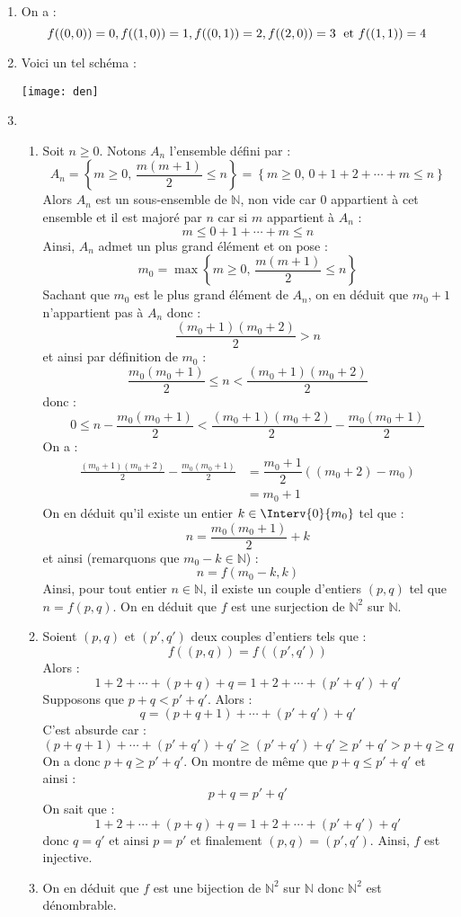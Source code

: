 \documentclass[a4paper,10pt]{report}
\begin{document}
\corr 
\begin{enumerate}
\item On a :
$$ f((0,0)) = 0,f((1,0))=1, f((0,1))= 2, f((2,0))=3 \; \hbox{ et } f((1,1))=4$$

\item Voici un tel schéma : 

\begin{center}
\texttt{[image: den]}
\end{center}

\item 
\begin{enumerate}
\item Soit $n \geq 0$. Notons $A_n$ l'ensemble défini par :
$$ A_n = \left\lbrace m \geq 0, \, \frac{m(m+1)}{2} \leq n \right\rbrace = \left\lbrace m \geq 0, \, 0+1+2+ \cdots + m \leq n \right\rbrace$$
Alors $A_n$ est un sous-ensemble de $\mathbb{N}$, non vide car $0$ appartient à cet ensemble et il est majoré par $n$ car si $m$ appartient à $A_n$ :
$$ m \leq 0+1+ \cdots + m \leq n$$
Ainsi, $A_n$ admet un plus grand élément et on pose :
$$ m_0 = \max \left\lbrace m \geq 0, \, \frac{m(m+1)}{2} \leq n \right\rbrace$$
Sachant que $m_0$ est le plus grand élément de $A_n$, on en déduit que $m_0+1$ n'appartient pas à $A_n$ donc :
$$ \frac{(m_0+1)(m_0+2)}{2} > n$$
et ainsi par définition de $m_0$ :
$$ \frac{m_0(m_0+1)}{2} \leq n  <\frac{(m_0+1)(m_0+2)}{2}$$
donc :
$$   0 \leq  n- \frac{m_0(m_0+1)}{2} <\frac{(m_0+1)(m_0+2)}{2} - \frac{m_0(m_0+1)}{2}$$
On a :
\begin{align*}
\frac{(m_0+1)(m_0+2)}{2} - \frac{m_0(m_0+1)}{2} & = \dfrac{m_0+1}{2} ((m_0+2)-m_0) \\
& = m_0+1 
\end{align*}
On en déduit qu'il existe un entier $k \in \Interv{0}{m_0}$ tel que :
$$ n = \frac{m_0(m_0+1)}{2} + k$$
et ainsi (remarquons que $m_0-k \in \mathbb{N}$) : 
$$ n = f(m_0-k,k)$$
Ainsi, pour tout entier $n \in \mathbb{N}$, il existe un couple d'entiers $(p,q)$ tel que $n=f(p,q)$. On en déduit que $f$ est une surjection de $\mathbb{N}^2$ sur $\mathbb{N}$.
\item Soient $(p,q)$ et $(p',q')$ deux couples d'entiers tels que :
$$ f((p,q))=f((p',q'))$$
Alors :
$$ 1+2+ \cdots + (p+q) + q = 1+2+ \cdots + (p'+q') + q'$$
Supposons que $p+q<p'+q'$. Alors :
$$ q= (p+q+1)+ \cdots +(p'+q') + q'$$
C'est absurde car :
$$ (p+q+1)+ \cdots +(p'+q') + q' \geq (p'+q')+q' \geq p'+q'>p+q \geq q$$
On a donc $p+q \geq p'+q'$. On montre de même que $p+q \leq p'+q'$ et ainsi :
$$ p+q = p'+q'$$
On sait que :
$$  1+2+ \cdots + (p+q) + q = 1+2+ \cdots + (p'+q') + q'$$
donc $q=q'$ et ainsi $p=p'$ et finalement $(p,q)=(p',q')$. Ainsi, $f$ est injective.
\item On en déduit que $f$ est une bijection de $\mathbb{N}^2$ sur $\mathbb{N}$ donc $\mathbb{N}^2$ est dénombrable.
\end{enumerate}
\end{enumerate}
\end{document}
